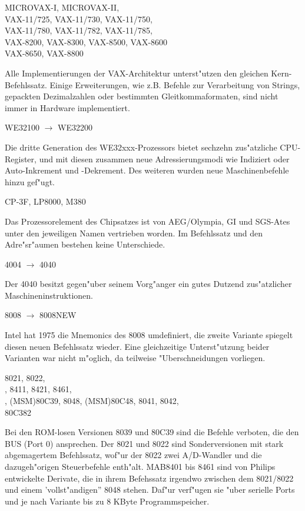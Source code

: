 \documentclass[12pt,a4paper,twoside]{report}
\begin{document}
\begin{cpulist}
   MICROVAX-I, MICROVAX-II, \\
\> VAX-11/725, VAX-11/730, VAX-11/750, \\
\> VAX-11/780, VAX-11/782, VAX-11/785, \\
\> VAX-8200, VAX-8300, VAX-8500, VAX-8600 \\
\> VAX-8650, VAX-8800
\end{cpulist}
Alle Implementierungen der VAX-Architektur unterst"utzen den
gleichen Kern-Befehlssatz.  Einige Erweiterungen, wie z.B.
Befehle zur Verarbeitung von Strings, gepackten Dezimalzahlen
oder bestimmten Gleitkommaformaten, sind nicht immer in
Hardware implementiert.
\begin{cpulist}
   WE32100 $\rightarrow$ WE32200
\end{cpulist}
Die dritte Generation des WE32xxx-Prozessors bietet sechzehn
zus"atzliche CPU-Register, und mit diesen zusammen neue
Adressierungsmodi wie Indiziert oder Auto-Inkrement und -Dekrement.
Des weiteren wurden neue Maschinenbefehle hinzu gef"ugt.
\begin{cpulist}
   CP-3F, LP8000, M380
\end{cpulist}
Das Prozessorelement des Chipsatzes ist von AEG/Olympia, GI
und SGS-Ates unter den jeweiligen Namen vertrieben worden.
Im Befehlssatz und den Adre"sr"aumen bestehen keine Unterschiede.
\begin{cpulist}
   4004 $\rightarrow$ 4040
\end{cpulist}
Der 4040 besitzt gegen"uber seinem Vorg"anger ein gutes Dutzend
zus"atzlicher Maschineninstruktionen.
\begin{cpulist}
   8008 $\rightarrow$ 8008NEW
\end{cpulist}
Intel hat 1975 die Mnemonics des 8008 umdefiniert, die zweite Variante spiegelt
diesen neuen Befehlssatz wieder.  Eine gleichzeitige Unterst"utzung beider
Varianten war nicht m"oglich, da teilweise "Uberschneidungen vorliegen.
\begin{cpulist}
   8021, 8022, \\
, 8411, 8421, 8461, \\
, (MSM)80C39, 8048, (MSM)80C48, 8041, 8042, \\
\> 80C382
\end{cpulist}
Bei den ROM-losen Versionen 8039 und 80C39 sind die Befehle verboten,
die den BUS (Port 0) ansprechen.  Der 8021 und 8022 sind Sonderversionen
mit stark abgemagertem Befehlssatz, wof"ur der 8022 zwei A/D-Wandler
und die dazugeh"origen Steuerbefehle enth"alt.  MAB8401 bis 8461 sind von
Philips entwickelte Derivate, die in ihrem Befehssatz irgendwo zwischen
dem 8021/8022 und einem 'vollst"andigen'' 8048 stehen.  Daf"ur verf"ugen
sie "uber serielle Ports und je nach Variante bis zu 8 KByte Programmspeicher.
\end{document}
